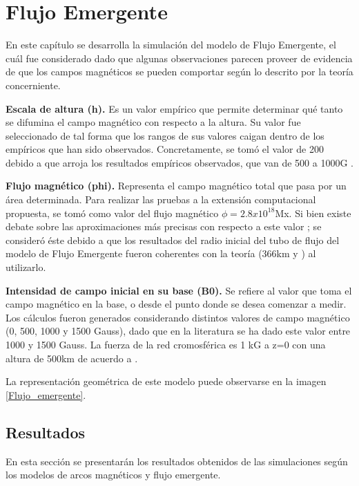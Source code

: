 \chapter{Flujo Emergente}

En este cap\'itulo se desarrolla la simulaci\'on del modelo de Flujo Emergente, el cu\'al fue considerado dado que algunas observaciones \citep{flux_reference} parecen proveer de evidencia de que los campos magn\'eticos se pueden comportar seg\'un lo descrito por la teor\'ia concerniente. 

\textbf{Escala de altura (h). }Es un valor emp\'irico que permite determinar qu\'e tanto se difumina el campo magn\'etico con respecto a la altura. Su valor fue seleccionado de tal forma que los rangos de sus valores caigan dentro de los emp\'iricos que han sido observados. Concretamente, se tom\'o el valor de 200 debido a que arroja los resultados emp\'iricos observados, que van de 500 a 1000G \citep{VAULT1}.

\textbf{Flujo magn\'etico (phi). }Representa el campo magn\'etico total que pasa por un \'area determinada. Para realizar las pruebas a la extensi\'on computacional propuesta, se tom\'o como valor del flujo magn\'etico $\phi=2.8x10^{18}$Mx. Si bien existe debate sobre las aproximaciones m\'as precisas con respecto a este valor \citep{magneticflux}; se consider\'o \'este debido a que los resultados del radio inicial del tubo de flujo del modelo de Flujo Emergente fueron coherentes con la teor\'ia (366km \citep{magneticflux} y \citep{VAULT2}) al utilizarlo.

\textbf{Intensidad de campo inicial en su base (B0). }Se refiere al valor que toma el campo magn\'etico en la base, o desde el punto donde se desea comenzar a medir. Los c\'alculos fueron generados considerando distintos valores de campo magn\'etico (0, 500, 1000 y 1500 Gauss), dado que en la literatura se ha dado este valor entre 1000 y 1500 Gauss. La fuerza de la red cromosf\'erica es 1 kG a z=0 con una altura de 500km de acuerdo a \citep{judge}.

La representaci\'on geom\'etrica de este modelo puede observarse en la imagen \ref{Flujo_emergente}.

\clearpage
\section{Resultados}

En esta secci\'on se presentar\'an los resultados obtenidos de las simulaciones seg\'un los modelos de arcos magn\'eticos y flujo emergente.

